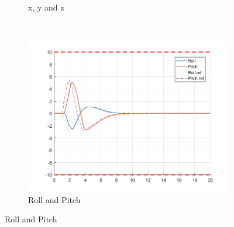 \documentclass[11pt]{article}
\begin{document}
\begin{enumerate}
\begin{figure}[ht]
\begin{subfigure}[c]{0.3\linewidth}
            \caption{x, y and z}
        \end{subfigure}
        ~
        \begin{subfigure}[c]{0.3\linewidth}
            \centering
            \includegraphics[width=\linewidth]{Plots_07_NonlinearModel_ReferenceTracking/03}
            \caption{Roll and Pitch}
        \end{subfigure}


\end{figure}
\end{enumerate}
\end{document}
